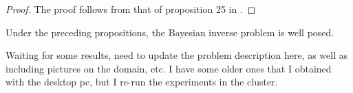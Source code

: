 \begin{proof}
	The proof follows from that of proposition 25 in \cite{hoang2013complexity}. %
\end{proof}

\begin{theorem}
Under the preceding propositions, the Bayesian inverse problem is well posed. 
\end{theorem}
\color{red} Waiting for some results, need to update the problem description here, as well as including pictures on the domain, etc. I have some older ones that I obtained with the desktop pc, but I re-run the experiments in the cluster.  \color{black}
